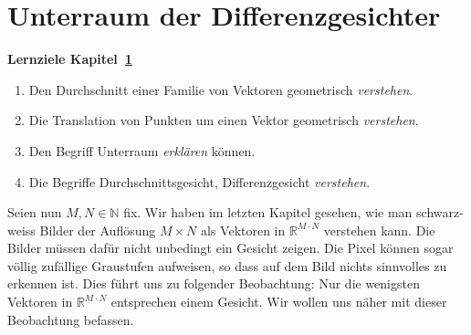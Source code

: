 \section{Unterraum der Differenzgesichter} \label{sec:facespace}
\begin{tcolorbox}
	\centerline{\textbf{Lernziele Kapitel~\ref{sec:facespace}}}
	\begin{enumerate}[leftmargin=*,label=\thesection.\arabic*]
		\item Den Durchschnitt einer Familie von Vektoren geometrisch \textit{verstehen}.
		\item Die Translation von Punkten um einen Vektor geometrisch \textit{verstehen}.
		\item Den Begriff \glqq{}Unterraum\grqq{} \textit{erklären} können.
		\item Die Begriffe Durchschnittsgesicht, Differenzgesicht \textit{verstehen}.
	\end{enumerate}
\end{tcolorbox}
Seien nun $M,N\in\mathbb N$ fix.
Wir haben im letzten Kapitel gesehen, wie man schwarz-weiss Bilder der Auflösung $M\times N$ als Vektoren in $\mathbb R^{M\cdot N}$ verstehen kann.
Die Bilder müssen dafür nicht unbedingt ein Gesicht zeigen.
Die Pixel können sogar völlig zufällige Graustufen aufweisen, so dass auf dem Bild nichts sinnvolles zu erkennen ist.
Dies führt uns zu folgender Beobachtung:
Nur die wenigsten Vektoren in $\mathbb R^{M\cdot N}$ entsprechen einem Gesicht.
Wir wollen uns näher mit dieser Beobachtung befassen.

